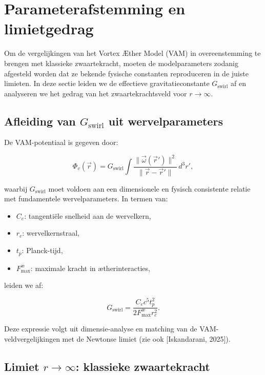 \section{Parameterafstemming en limietgedrag}\label{sec:appendix_6}

Om de vergelijkingen van het Vortex Æther Model (VAM) in overeenstemming te brengen met klassieke zwaartekracht, moeten de modelparameters zodanig afgesteld worden dat ze bekende fysische constanten reproduceren in de juiste limieten. In deze sectie leiden we de effectieve gravitatieconstante $G_\text{swirl}$ af en analyseren we het gedrag van het zwaartekrachtsveld voor $r \to \infty$.

\subsection{Afleiding van $G_\text{swirl}$ uit wervelparameters}

De VAM-potentiaal is gegeven door:

\begin{equation}
\Phi_v(\vec{r}) = G_\text{swirl} \int \frac{\|\vec{\omega}(\vec{r}')\|^2}{\|\vec{r} - \vec{r}'\|} \, d^3r',
\end{equation}

waarbij $G_\text{swirl}$ moet voldoen aan een dimensionele en fysisch consistente relatie met fundamentele wervelparameters. In termen van:

\begin{itemize}
  \item $C_e$: tangentiële snelheid aan de wervelkern,
  \item $r_c$: wervelkernstraal,
  \item $t_p$: Planck-tijd,
  \item $F^{\text{\ae}}_{\text{max}}$: maximale kracht in ætherinteracties,
\end{itemize}

leiden we af:

\begin{equation}
G_\text{swirl} = \frac{C_e c^5 t_p^2}{2 F^{\text{\ae}}_{\text{max}} r_c^2}.
\end{equation}

Deze expressie volgt uit dimensie-analyse en matching van de VAM-veldvergelijkingen met de Newtonse limiet (zie ook [Iskandarani, 2025]).

\subsection{Limiet $r \to \infty$: klassieke zwaartekracht}

